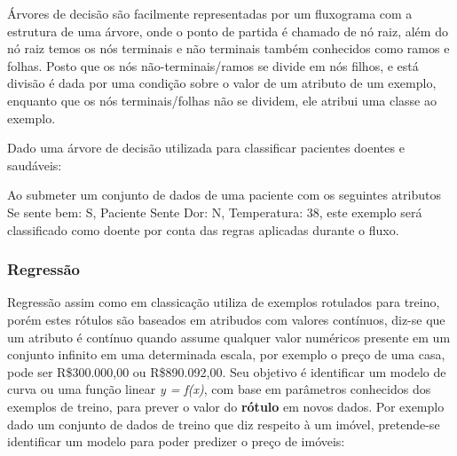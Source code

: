 Árvores de decisão são facilmente representadas por um fluxograma com a estrutura de uma árvore, onde o ponto de partida é chamado de nó raiz,
além do nó raiz temos os nós terminais e não terminais também conhecidos como ramos e folhas. Posto que os nós não-terminais/ramos se divide em nós filhos,
e está divisão é dada por uma condição sobre o valor de um atributo de um exemplo, enquanto que os nós terminais/folhas não se dividem, ele atribui uma classe ao exemplo.

Dado uma árvore de decisão utilizada para classificar pacientes doentes e saudáveis:

\begin{figure}[ht!]
	\centering
	\Caption{\label{fig:ex-arvore} }	
\end{figure}

Ao submeter um conjunto de dados de uma paciente com os seguintes atributos {Se sente bem: S, Paciente Sente Dor: N, Temperatura: 38}, 
este exemplo será classificado como doente por conta das regras aplicadas durante o fluxo.

\subsubsection{Regressão}
\label{subsubsec{regressao}}
Regressão assim como em classicação utiliza de exemplos rotulados para treino, porém estes rótulos são baseados em atribudos com valores contínuos, 
diz-se que um atributo é contínuo quando assume qualquer valor numéricos presente em um conjunto infinito em uma determinada escala, por exemplo o preço de uma casa, 
pode ser R\$300.000,00 ou R\$890.092,00. Seu objetivo é identificar um modelo de curva ou uma função linear \textit{y = f(x)}, com base
em parâmetros conhecidos dos exemplos de treino, para prever o valor do \textbf{rótulo} em novos dados.
Por exemplo dado um conjunto de dados de treino que diz respeito à um imóvel, pretende-se identificar um modelo para poder predizer
o preço de imóveis:

